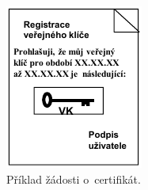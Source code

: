 \begin{figure}[H]
    \centering
    \includegraphics[width=0.35\linewidth]{registrace_certifikatu.pdf}
    \caption{Příklad žádosti o~certifikát.}
\end{figure}
